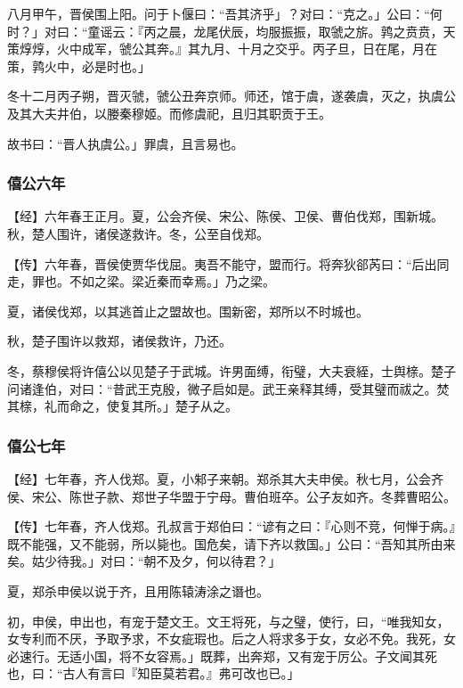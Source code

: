 \documentclass[]{article}
\begin{document}
八月甲午，晋侯围上阳。问于卜偃曰：``吾其济乎」？对曰：``克之。」公曰：``何时？」对曰：``童谣云：『丙之晨，龙尾伏辰，均服振振，取虢之旂。鹑之贲贲，天策焞焞，火中成军，虢公其奔。』其九月、十月之交乎。丙子旦，日在尾，月在策，鹑火中，必是时也。」

冬十二月丙子朔，晋灭虢，虢公丑奔京师。师还，馆于虞，遂袭虞，灭之，执虞公及其大夫井伯，以媵秦穆姬。而修虞祀，且归其职贡于王。

故书曰：``晋人执虞公。」罪虞，且言易也。

\hypertarget{header-n709}{%
\subsubsection{僖公六年}\label{header-n709}}

【经】六年春王正月。夏，公会齐侯、宋公、陈侯、卫侯、曹伯伐郑，围新城。秋，楚人围许，诸侯遂救许。冬，公至自伐郑。

【传】六年春，晋侯使贾华伐屈。夷吾不能守，盟而行。将奔狄郤芮曰：``后出同走，罪也。不如之梁。梁近秦而幸焉。」乃之梁。

夏，诸侯伐郑，以其逃首止之盟故也。围新密，郑所以不时城也。

秋，楚子围许以救郑，诸侯救许，乃还。

冬，蔡穆侯将许僖公以见楚子于武城。许男面缚，衔璧，大夫衰絰，士舆榇。楚子问诸逢伯，对曰：``昔武王克殷，微子启如是。武王亲释其缚，受其璧而祓之。焚其榇，礼而命之，使复其所。」楚子从之。

\hypertarget{header-n717}{%
\subsubsection{僖公七年}\label{header-n717}}

【经】七年春，齐人伐郑。夏，小邾子来朝。郑杀其大夫申侯。秋七月，公会齐侯、宋公、陈世子款、郑世子华盟于宁母。曹伯班卒。公子友如齐。冬葬曹昭公。

【传】七年春，齐人伐郑。孔叔言于郑伯曰：``谚有之曰：『心则不竞，何惮于病。』既不能强，又不能弱，所以毙也。国危矣，请下齐以救国。」公曰：``吾知其所由来矣。姑少待我。」对曰：``朝不及夕，何以待君？」

夏，郑杀申侯以说于齐，且用陈辕涛涂之谮也。

初，申侯，申出也，有宠于楚文王。文王将死，与之璧，使行，曰，``唯我知女，女专利而不厌，予取予求，不女疵瑕也。后之人将求多于女，女必不免。我死，女必速行。无适小国，将不女容焉。」既葬，出奔郑，又有宠于厉公。子文闻其死也，曰：``古人有言曰『知臣莫若君。』弗可改也已。」
\end{document}
